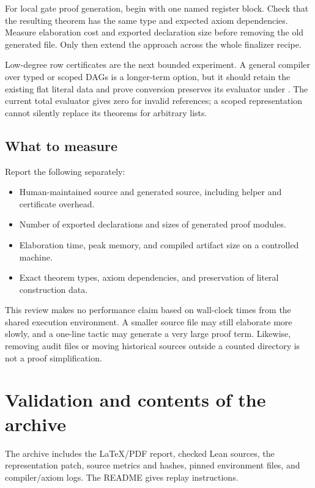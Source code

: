 \documentclass[11pt,letterpaper]{article}
\newcommand{\code}[1]{\texttt{\detokenize{#1}}}
\begin{document}
For local gate proof generation, begin with one named register block. Check that the resulting theorem has the same type and expected axiom dependencies. Measure elaboration cost and exported declaration size before removing the old generated file. Only then extend the approach across the whole finalizer recipe.

Low-degree row certificates are the next bounded experiment. A general compiler over typed or scoped DAGs is a longer-term option, but it should retain the existing flat literal data and prove conversion preserves its evaluator under \code{Topological}. The current total evaluator gives zero for invalid references; a scoped representation cannot silently replace its theorems for arbitrary lists.

\subsection{What to measure}

Report the following separately:
\begin{itemize}
\item Human-maintained source and generated source, including helper and certificate overhead.
\item Number of exported declarations and sizes of generated proof modules.
\item Elaboration time, peak memory, and compiled artifact size on a controlled machine.
\item Exact theorem types, axiom dependencies, and preservation of literal construction data.
\end{itemize}
This review makes no performance claim based on wall-clock times from the shared execution environment. A smaller source file may still elaborate more slowly, and a one-line tactic may generate a very large proof term. Likewise, removing audit files or moving historical sources outside a counted directory is not a proof simplification.

\section{Validation and contents of the archive}



The archive includes the LaTeX/PDF report, checked Lean sources, the representation patch, source metrics and hashes, pinned environment files, and compiler/axiom logs. The README gives replay instructions.
\end{document}
